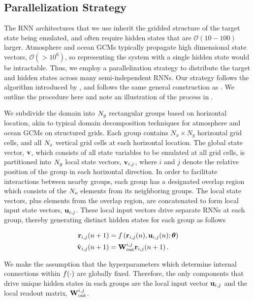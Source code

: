 \subsection{Parallelization Strategy}
\label{subsec:parallelization}

The RNN architectures that we use inherit the gridded structure of the target
state being emulated, and often require hidden states that are
$\mathcal{O}(10-100)$ larger.
Atmosphere and ocean GCMs typically propagate high dimensional state vectors,
$\mathcal{O}(>10^6)$,
so representing the system with a single hidden state would be intractable.
Thus, we employ a parallelization strategy to distribute the target and hidden
states across many semi-independent RNNs.
Our strategy follows the algorithm introduced by \citet{pathak_model-free_2018},
and follows the same general construction as \citet{arcomano_machine_2020}.
We outline the procedure here and note an illustration of the process in
.

We subdivide the domain into $N_{g}$ rectangular groups based on horizontal location,
akin to typical domain decomposition techniques for atmosphere and ocean
GCMs on structured grids.
Each group contains
$N_x\times N_y$ horizontal grid cells, and all $N_{z}$
vertical grid cells at each horizontal location.
The global state vector, $\mathbf{v}$, which consists of all state variables to be
emulated at all grid cells, is partitioned into $N_{g}$ local state vectors,
$\mathbf{v}_{i,j}$, where $i$ and $j$ denote the relative position of the group in
each horizontal direction.
In order to facilitate interactions between nearby groups, each group
has a designated overlap region which consists of the $N_{o}$ elements
from its neighboring groups.
The local state vectors, plus elements from the overlap region, are concatenated
to form local input state vectors, $\mathbf{u}_{i,j}$.
These local input vectors drive separate RNNs at each group, thereby generating
distinct hidden states for each group as follows
\begin{linenomath*}\begin{equation}
    \begin{aligned}
        \mathbf{r}_{i,j}(n+1)
        &= f\left(
            \mathbf{r}_{i,j}(n), \mathbf{u}_{i,j}(n); \bm{\theta}
        \right) \\
        \hat{\mathbf{v}}_{i,j}(n+1)
        &= \mathbf{W}_\text{out}^{i,j} \mathbf{r}_{i,j}(n+1) \, .
    \end{aligned}
    \label{eq:local-rnn}
\end{equation}\end{linenomath*}
We make the assumption that the hyperparameters which determine internal
connections within $f(\cdot)$ are globally fixed.
Therefore, the only components
that drive unique hidden states in each groups are the local input vector
$\mathbf{u}_{i,j}$ and the local readout matrix, $\mathbf{W}_\text{out}^{i,j}$.

